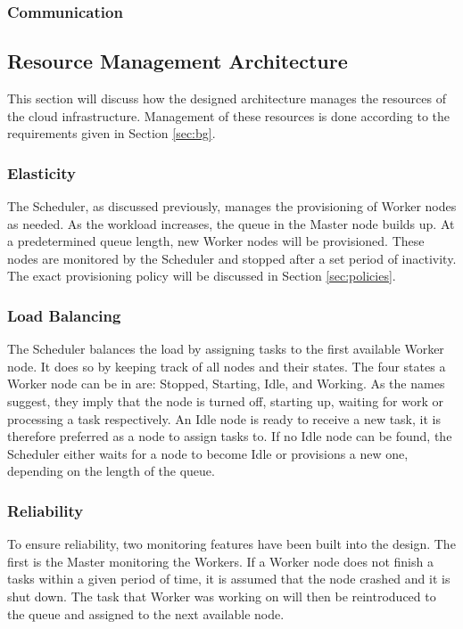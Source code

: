 \documentclass{acm_proc_article-sp}
\begin{document}
\subsubsection{Communication}

\subsection{Resource Management Architecture}
\label{sec:resource_man}
This section will discuss how the designed architecture manages the resources of the cloud infrastructure.
Management of these resources is done according to the requirements given in Section \ref{sec:bg}.

\subsubsection{Elasticity}
The Scheduler, as discussed previously, manages the provisioning of Worker nodes as needed.
As the workload increases, the queue in the Master node builds up.
At a predetermined queue length, new Worker nodes will be provisioned.
These nodes are monitored by the Scheduler and stopped after a set period of inactivity.
The exact provisioning policy will be discussed in Section \ref{sec:policies}.

\subsubsection{Load Balancing}
The Scheduler balances the load by assigning tasks to the first available Worker node.
It does so by keeping track of all nodes and their states.
The four states a Worker node can be in are: Stopped, Starting, Idle, and Working.
As the names suggest, they imply that the node is turned off, starting up, waiting for work or processing a task respectively.
An Idle node is ready to receive a new task, it is therefore preferred as a node to assign tasks to.
If no Idle node can be found, the Scheduler either waits for a node to become Idle or provisions a new one, depending on the length of the queue.

\subsubsection{Reliability}
To ensure reliability, two monitoring features have been built into the design.
The first is the Master monitoring the Workers.
If a Worker node does not finish a tasks within a given period of time, it is assumed that the node crashed and it is shut down.
The task that Worker was working on will then be reintroduced to the queue and assigned to the next available node.
\end{document}
